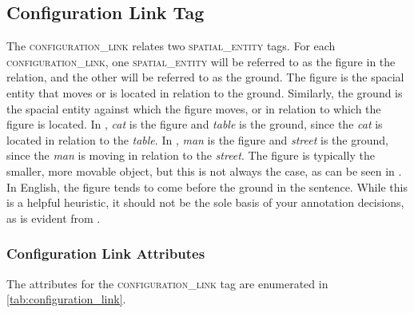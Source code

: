 \documentclass[11pt]{article}
\begin{document}
\subsection{Configuration Link Tag} %
\label{sub:configuration_link}
The \textsc{configuration\_link} relates two \textsc{spatial\_entity} tags. For each \textsc{configuration\_link}, one \textsc{spatial\_entity} will be referred to as the figure in the relation, and the other will be referred to as the ground. The figure is the spacial entity that moves or is located in relation to the ground. Similarly, the ground is the spacial entity against which the figure moves, or in relation to which the figure is located. In , \emph{cat} is the figure and \emph{table} is the ground, since the \emph{cat} is located in relation to the \emph{table}. In , \emph{man} is the figure and \emph{street} is the ground, since the \emph{man} is moving in relation to the \emph{street}. The figure is typically the smaller, more movable object, but this is not always the case, as can be seen in . In English, the figure tends to come before the ground in the sentence. While this is a helpful heuristic, it should not be the sole basis of your annotation decisions, as is evident from .
 

\label{ex:fig_ground_examples}




\subsubsection{Configuration Link Attributes} %
\label{ssub:configuration_link_attributes}

The attributes for the \textsc{configuration\_link} tag are enumerated in \cref{tab:configuration_link}. 
\end{document}
